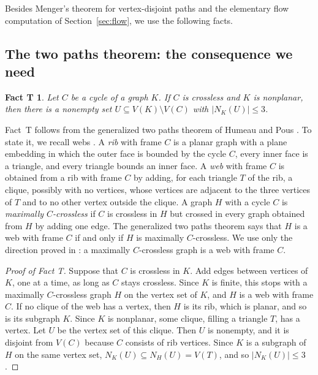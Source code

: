\documentclass[11pt]{article}
\newtheorem*{factT}{Fact T}
\begin{document}
Besides Menger's theorem for vertex-disjoint paths and the elementary flow
computation of Section~\ref{sec:flow}, we use the following facts.

\subsection*{The two paths theorem: the consequence we need}

\begin{factT}
Let $C$ be a cycle of a graph $K$. If $C$ is crossless and $K$ is nonplanar,
then there is a nonempty set $U\subseteq V(K)\setminus V(C)$ with
$|N_K(U)|\le 3$.
\end{factT}

Fact~T follows from the generalized two paths theorem of Humeau and Pous
\cite[Theorem~1.3, page~2]{HP25}. To state it, we recall webs
\cite[Definition~2.1, page~6]{HP25}. A \emph{rib} with frame $C$ is a planar
graph with a plane embedding in which the outer face is bounded by the cycle
$C$, every inner face is a triangle, and every triangle bounds an inner face.
A \emph{web} with frame $C$ is obtained from a rib with frame $C$ by adding,
for each triangle $T$ of the rib, a clique, possibly with no vertices, whose
vertices are adjacent to the three vertices of $T$ and to no other vertex
outside the clique. A graph $H$ with a cycle $C$ is \emph{maximally
$C$-crossless} if $C$ is crossless in $H$ but crossed in every graph obtained
from $H$ by adding one edge. The generalized two paths theorem says that $H$ is
a web with frame $C$ if and only if $H$ is maximally $C$-crossless. We use only
the direction proved in \cite[Lemma~4.3, page~13]{HP25}: a maximally
$C$-crossless graph is a web with frame $C$.

\begin{proof}[Proof of Fact T]
Suppose that $C$ is crossless in $K$. Add edges between vertices of $K$, one at
a time, as long as $C$ stays crossless. Since $K$ is finite, this stops with a
maximally $C$-crossless graph $H$ on the vertex set of $K$, and $H$ is a web
with frame $C$. If no clique of the web has a vertex, then $H$ is its rib,
which is planar, and so is its subgraph $K$. Since $K$ is nonplanar, some
clique, filling a triangle $T$, has a vertex. Let $U$ be the vertex set of
this clique. Then $U$ is nonempty, and it is disjoint from $V(C)$ because $C$
consists of rib vertices. Since $K$ is a subgraph of $H$ on the same vertex
set, $N_K(U)\subseteq N_H(U)=V(T)$, and so $|N_K(U)|\le3$.
\end{proof}
\end{document}
